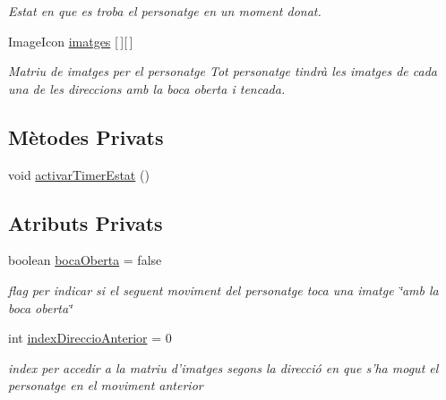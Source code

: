 \begin{DoxyCompactItemize}
\begin{DoxyCompactList}\small\item\em Estat en que es troba el personatge en un moment donat. \end{DoxyCompactList}\item 
\hypertarget{classlogica_1_1_personatge_a066a8096f86141bc7a7400cca4c18a7b}{Image\+Icon \hyperlink{classlogica_1_1_personatge_a066a8096f86141bc7a7400cca4c18a7b}{imatges} \mbox{[}$\,$\mbox{]}\mbox{[}$\,$\mbox{]}}\label{classlogica_1_1_personatge_a066a8096f86141bc7a7400cca4c18a7b}

\begin{DoxyCompactList}\small\item\em Matriu de imatges per el personatge Tot personatge tindrà les imatges de cada una de les direccions amb la boca oberta i tencada. \end{DoxyCompactList}\end{DoxyCompactItemize}
\subsection*{Mètodes Privats}
\begin{DoxyCompactItemize}
\item 
void \hyperlink{classlogica_1_1_personatge_a40404c4af8ad3277f37c78fbef95a926}{activar\+Timer\+Estat} ()
\end{DoxyCompactItemize}
\subsection*{Atributs Privats}
\begin{DoxyCompactItemize}
\item 
\hypertarget{classlogica_1_1_personatge_ae31501dcb29ace9d4bcfee0fd2e4b8c1}{boolean \hyperlink{classlogica_1_1_personatge_ae31501dcb29ace9d4bcfee0fd2e4b8c1}{boca\+Oberta} = false}\label{classlogica_1_1_personatge_ae31501dcb29ace9d4bcfee0fd2e4b8c1}

\begin{DoxyCompactList}\small\item\em flag per indicar si el seguent moviment del personatge toca una imatge \char`\"{}amb la boca oberta\char`\"{} \end{DoxyCompactList}\item 
\hypertarget{classlogica_1_1_personatge_a9ee15210d2e76e1be387aad61b8d3698}{int \hyperlink{classlogica_1_1_personatge_a9ee15210d2e76e1be387aad61b8d3698}{index\+Direccio\+Anterior} = 0}\label{classlogica_1_1_personatge_a9ee15210d2e76e1be387aad61b8d3698}

\begin{DoxyCompactList}\small\item\em index per accedir a la matriu d'imatges segons la direcció en que s'ha mogut el personatge en el moviment anterior \end{DoxyCompactList}\end{DoxyCompactItemize}
